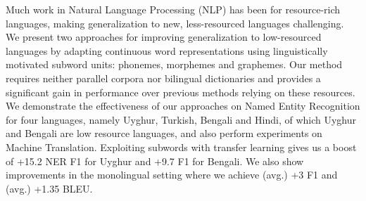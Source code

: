 Much work in Natural Language Processing (NLP) has been for resource-rich languages, making generalization to new, less-resourced languages challenging. We present two approaches for improving generalization to low-resourced languages by adapting continuous word representations using linguistically motivated subword units: phonemes, morphemes and graphemes. Our method requires neither parallel corpora nor bilingual dictionaries and provides a significant gain in performance over previous methods relying on these resources. We demonstrate the effectiveness of our approaches on Named Entity Recognition for four languages, namely Uyghur, Turkish, Bengali and Hindi, of which Uyghur and Bengali are low resource languages, and also perform experiments on Machine Translation. Exploiting subwords with transfer learning gives us a boost of +15.2 NER F1 for Uyghur and +9.7 F1 for Bengali. We also show improvements in the monolingual setting where we achieve (avg.) +3 F1 and (avg.) +1.35 BLEU.
